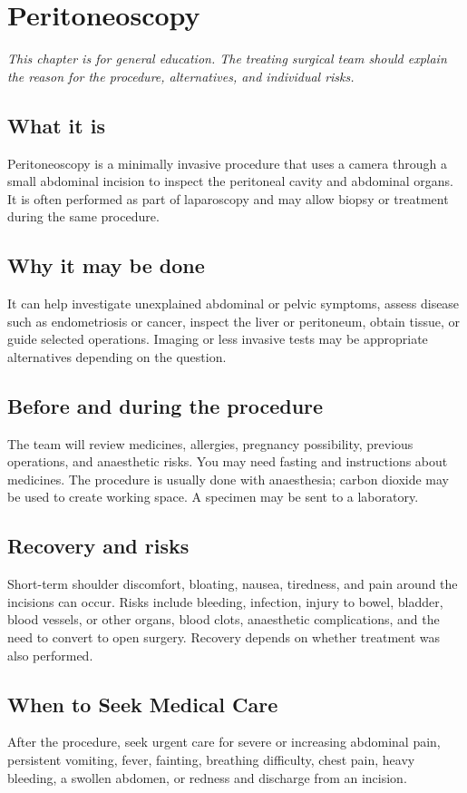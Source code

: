 \chapter{Peritoneoscopy}

\medskip
\noindent\textit{This chapter is for general education. The treating surgical team should explain the reason for the procedure, alternatives, and individual risks.}

\section*{What it is}
Peritoneoscopy is a minimally invasive procedure that uses a camera through a small abdominal incision to inspect the peritoneal cavity and abdominal organs. It is often performed as part of laparoscopy and may allow biopsy or treatment during the same procedure.

\section*{Why it may be done}
It can help investigate unexplained abdominal or pelvic symptoms, assess disease such as endometriosis or cancer, inspect the liver or peritoneum, obtain tissue, or guide selected operations. Imaging or less invasive tests may be appropriate alternatives depending on the question.

\section*{Before and during the procedure}
The team will review medicines, allergies, pregnancy possibility, previous operations, and anaesthetic risks. You may need fasting and instructions about medicines. The procedure is usually done with anaesthesia; carbon dioxide may be used to create working space. A specimen may be sent to a laboratory.

\section*{Recovery and risks}
Short-term shoulder discomfort, bloating, nausea, tiredness, and pain around the incisions can occur. Risks include bleeding, infection, injury to bowel, bladder, blood vessels, or other organs, blood clots, anaesthetic complications, and the need to convert to open surgery. Recovery depends on whether treatment was also performed.

\section*{When to Seek Medical Care}
After the procedure, seek urgent care for severe or increasing abdominal pain, persistent vomiting, fever, fainting, breathing difficulty, chest pain, heavy bleeding, a swollen abdomen, or redness and discharge from an incision.

